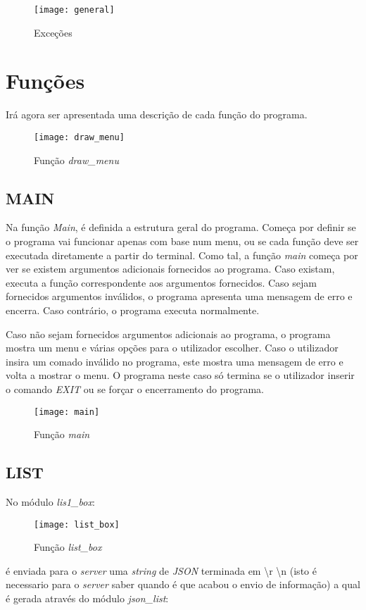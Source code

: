 \documentclass{report}
\begin{document}
\begin{figure}[h]
\center
\texttt{[image: general]}
\caption{Exceções}
\label{fig:general}
\end{figure}


\FloatBarrier
\section{Funções}
Irá agora ser apresentada uma descrição de cada função do programa.

\begin{figure}[h]
\center
\texttt{[image: draw\_menu]}
\caption{Função \textit{draw\_menu}}
\label{fig:draw_menu}
\end{figure}

\newpage
\FloatBarrier
\subsection{MAIN}

Na função \textit{Main}, é definida a estrutura geral do programa.
Começa por definir se o programa vai funcionar apenas com base num menu, ou se cada função deve ser executada diretamente a partir do terminal. Como tal, a função \textit{main} começa por ver se existem argumentos adicionais fornecidos ao programa. Caso existam, executa a função correspondente aos argumentos fornecidos. Caso sejam fornecidos argumentos inválidos, o programa apresenta uma mensagem de erro e encerra. Caso contrário, o programa executa normalmente.

Caso não sejam fornecidos argumentos adicionais ao programa, o programa mostra um menu e várias opções para o utilizador escolher. Caso o utilizador insira um comado inválido no programa, este mostra uma mensagem de erro e volta a mostrar o menu. O programa neste caso só termina se o utilizador inserir o comando \textit{EXIT} ou se forçar o encerramento do programa.

\begin{figure}[h]
\center
\texttt{[image: main]}
\caption{Função \textit{main}}
\label{fig:main}
\end{figure}

\newpage
\FloatBarrier
\subsection{LIST}

No módulo \textit{lis1\_box}: 
\begin{figure}[h]
\center
\texttt{[image: list\_box]}
\caption{Função \textit{list\_box}}
\label{fig:list_box}
\end{figure}
é enviada para o \textit{server} uma \textit{string} de \textit{JSON} terminada em \textbackslash r \textbackslash n (isto é necessario para o \textit{server} saber quando é que acabou o envio de informação) a qual é gerada através do módulo \textit{json\_list}:
\end{document}
